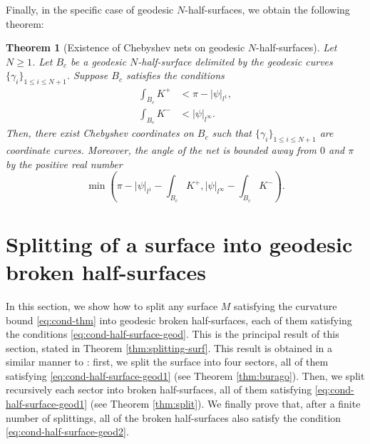 \documentclass{article}
\newcommand{\surf}{M}
\newcommand{\halfP}{B}
\newcommand{\psim}{|\psi|_{l^\infty}}
\newcommand{\psitot}{|\psi|_{l^1}}
\newtheorem{theorem}{Theorem}
\theoremstyle{remark}
\theoremstyle{prpart}
\begin{document}
Finally, in the specific case of geodesic $N$-half-surfaces, we obtain the following theorem:
\begin{theorem}[Existence of Chebyshev nets on geodesic $N$-half-surfaces]\label{thm:cheb-half-surface}
  Let $N\geq 1$. Let $\halfP_c$ be a geodesic $N$-half-surface delimited by the geodesic curves $\{\gamma_i\}_{1\leq i\leq N+1}$. Suppose $\halfP_c$ satisfies the conditions
  \begin{subequations} \label{eq:cond-half-surface-geod}
    \begin{alignat}{2}\label{eq:cond-half-surface-geod1}
      \int_{\halfP_c} K^+ &< \pi-\psitot,\\
      \int_{\halfP_c} K^- &<  \psim.\label{eq:cond-half-surface-geod2}
    \end{alignat}
  \end{subequations}
  Then, there exist Chebyshev coordinates on $\halfP_c$ such that $\{\gamma_i\}_{1\leq i\leq N+1}$ are coordinate curves. Moreover, the angle of the net is bounded away from $0$ and $\pi$ by the positive real number
  \begin{equation}\label{eq:bound-max-angles2}
    \min\left(\pi-\psitot-\int_{\halfP_c} K^+,|\psi|_{l^\infty}-\int_{\halfP_c} K^-\right).
  \end{equation}
\end{theorem}

\section{Splitting of a surface into geodesic broken half-surfaces}\label{subsec:splitting}
In this section, we show how to split any surface $\surf$ satisfying the curvature bound \eqref{eq:cond-thm}
into geodesic broken half-surfaces, each of them satisfying the conditions \eqref{eq:cond-half-surface-geod}. This is the principal result of this section, stated in Theorem \ref{thm:splitting-surf}.
This result is obtained in a similar manner to \cite[Th. 4]{Bur05}: first, we split the surface into four sectors, all of them satisfying \eqref{eq:cond-half-surface-geod1} (see Theorem \ref{thm:burago}). Then, we split recursively each sector into broken half-surfaces, all of them satisfying \eqref{eq:cond-half-surface-geod1} (see Theorem \ref{thm:split}). We finally prove that, after a finite number of splittings, all of the broken half-surfaces also satisfy the condition \eqref{eq:cond-half-surface-geod2}.
\end{document}
